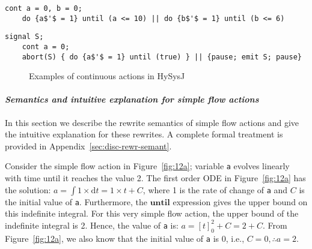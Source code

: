 \documentclass[10pt,journal,cspaper,compsoc]{IEEEtran}
\begin{document}
\newbox{\clt}
\begin{lrbox}{\clt}
  \begin{lstlisting}[mathescape,style=sysj,morekeywords={until,cont,signal,loop,abort,await,emit,present,trap,pause,exit,delay,suspend}]
    cont a = 0, b = 0; 
    do {a$'$ = 1} until (a <= 10) || do {b$'$ = 1} until (b <= 6)
  \end{lstlisting}
\end{lrbox}

\newbox{\clff}
\begin{lrbox}{\clff}
  \begin{lstlisting}[mathescape,style=sysj,morekeywords={until,cont,signal,loop,abort,await,emit,present,trap,pause,exit,delay,suspend}]
    signal S;
    cont a = 0; 
    abort(S) { do {a$'$ = 1} until (true) } || {pause; emit S; pause}
  \end{lstlisting}
\end{lrbox}

\begin{figure}[t!]
  \centering
  



  \caption{Examples of continuous actions in HySysJ}
  \label{fig:12}
\end{figure}

\paragraph{\textit{Semantics and intuitive explanation for simple flow actions}}
\label{sec:flow-actions-1}

In this section we describe the rewrite semantics of simple flow actions
and give the intuitive explanation for these rewrites. A complete formal
treatment is provided in Appendix~\ref{sec:disc-rewr-semant}. 

Consider the simple flow action in Figure~\ref{fig:12a}; variable
\texttt{a} evolves linearly with time until it reaches the value 2. The
first order ODE in Figure~\ref{fig:12a} has the solution:
\mbox{$a = \int 1 \times \mathrm{d}t = 1 \times t + C$}, where 1 is the
rate of change of \texttt{a} and $C$ is the initial value of
\texttt{a}. Furthermore, the $\mathbf{until}$ expression gives the upper
bound on this indefinite integral. For this very simple flow action, the
upper bound of the indefinite integral is 2. Hence, the value of
\texttt{a} is: $a = [t]^2_0 + C = 2 + C$. From Figure~\ref{fig:12a}, we
also know that the initial value of \texttt{a} is 0, i.e.,
$ C = 0, \therefore a = 2$.
\end{document}
